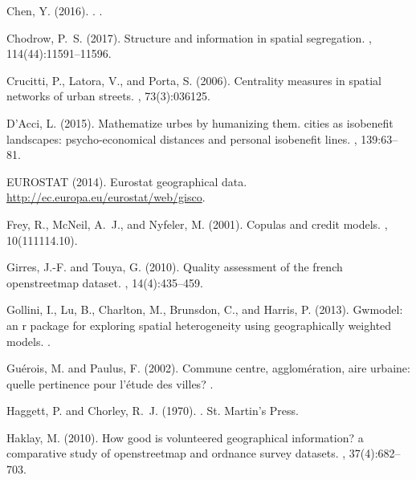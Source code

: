 \documentclass[11pt]{article}
\begin{document}
\begin{multicols}{2}
\begin{thebibliography}{}
{Chen}, Y. (2016).
.
.

Chodrow, P.~S. (2017).
\newblock Structure and information in spatial segregation.
,
  114(44):11591--11596.

Crucitti, P., Latora, V., and Porta, S. (2006).
\newblock Centrality measures in spatial networks of urban streets.
, 73(3):036125.

D’Acci, L. (2015).
\newblock Mathematize urbes by humanizing them. cities as isobenefit
  landscapes: psycho-economical distances and personal isobenefit lines.
, 139:63--81.

EUROSTAT (2014).
\newblock Eurostat geographical data.
\newblock \url{http://ec.europa.eu/eurostat/web/gisco}.

Frey, R., McNeil, A.~J., and Nyfeler, M. (2001).
\newblock Copulas and credit models.
, 10(111114.10).

Girres, J.-F. and Touya, G. (2010).
\newblock Quality assessment of the french openstreetmap dataset.
, 14(4):435--459.

Gollini, I., Lu, B., Charlton, M., Brunsdon, C., and Harris, P. (2013).
\newblock Gwmodel: an r package for exploring spatial heterogeneity using
  geographically weighted models.
.

Gu{\'e}rois, M. and Paulus, F. (2002).
\newblock Commune centre, agglom{\'e}ration, aire urbaine: quelle pertinence
  pour l'{\'e}tude des villes?
.

Haggett, P. and Chorley, R.~J. (1970).
.
\newblock St. Martin's Press.

Haklay, M. (2010).
\newblock How good is volunteered geographical information? a comparative study
  of openstreetmap and ordnance survey datasets.
,
  37(4):682--703.


\end{thebibliography}
\end{multicols}
\end{document}
